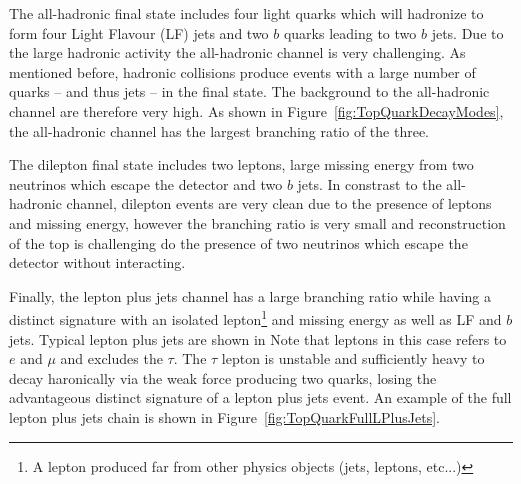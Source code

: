 The all-hadronic final state includes four light quarks which will hadronize to form four Light Flavour (LF) jets and two $b$ quarks leading to two $b$ jets. Due to the large hadronic activity the all-hadronic channel is very challenging. As mentioned before, hadronic collisions produce events with a large number of quarks -- and thus jets -- in the final state. The background to the all-hadronic channel are therefore very high. As shown in Figure~\ref{fig:TopQuarkDecayModes}, the all-hadronic channel has the largest branching ratio of the three.

The dilepton final state includes two leptons, large missing energy from two neutrinos which escape the detector and two $b$ jets. In constrast to the all-hadronic channel, dilepton events are very clean due to the presence of leptons and missing energy, however the branching ratio is very small and reconstruction of the top is challenging do the presence of two neutrinos which escape the detector without interacting.

Finally, the lepton plus jets channel has a large branching ratio while having a distinct signature with an isolated lepton\footnote{A lepton produced far from other physics objects (jets, leptons, etc...)} and missing energy as well as LF and $b$ jets. Typical lepton plus jets are shown in  Note that leptons in this case refers to $e$ and $\mu$ and excludes the $\tau$. The $\tau$ lepton is unstable and sufficiently heavy to decay haronically via the weak force producing two quarks, losing the advantageous distinct signature of a lepton plus jets event. An example of the full lepton plus jets chain is shown in Figure~\ref{fig:TopQuarkFullLPlusJets}.

